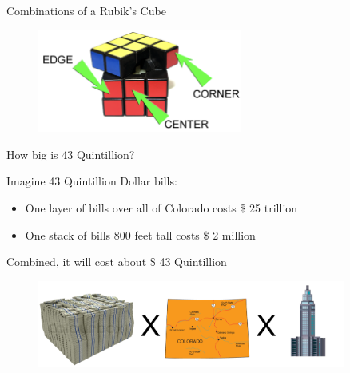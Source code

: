 \documentclass[final]{beamer}
\newlength{\colwidth}
\begin{document}
\begin{frame}[t]
\begin{columns}[t]
\begin{column}{\colwidth}
\begin{block}{Combinations of a Rubik's Cube}
    \begin{figure}
      \centering
                    \includegraphics[width=0.6\textwidth]{logos/rubikspieces.png}
    \end{figure}

  \end{block}

  \begin{block}{How big is 43 Quintillion?}

    \large 

    Imagine 43 Quintillion Dollar bills:

    \begin{itemize}
      \item One layer of bills over all of Colorado costs \$ 25 trillion
      \item One stack of bills 800 feet tall costs \$ 2 million
    \end{itemize}

    Combined, it will cost about \$ 43 Quintillion

    \begin{figure}
      \centering
                    \includegraphics[width=0.9\textwidth]{logos/moneyvisual.png}
    \end{figure}


\end{block}
\end{column}
\end{columns}
\end{frame}
\end{document}
